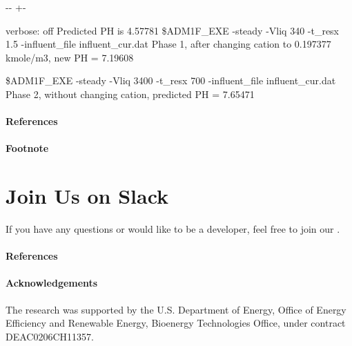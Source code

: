 \documentclass[a4paper,10pt,english]{sphinxmanual}
\newlength\nbsphinxcodecellspacing
\begin{document}
{

\kern-\sphinxverbatimsmallskipamount\kern-\baselineskip
\kern+\FrameHeightAdjust\kern-\fboxrule
\vspace{\nbsphinxcodecellspacing}

\begin{sphinxVerbatim}[commandchars=\\\{\}]
verbose: off
Predicted PH is 4.57781
\$ADM1F\_EXE -steady -Vliq 340 -t\_resx 1.5 -influent\_file influent\_cur.dat
Phase 1, after changing cation to 0.197377 kmole/m3, new PH = 7.19608

\$ADM1F\_EXE -steady -Vliq 3400 -t\_resx 700 -influent\_file influent\_cur.dat
Phase 2, without changing cation, predicted PH = 7.65471
\end{sphinxVerbatim}
}
\subsubsection*{References}
\subsubsection*{Footnote}


\chapter{Join Us on Slack}
\label{\detokenize{join:join-us-on-slack}}\label{\detokenize{join::doc}}
\sphinxAtStartPar
If you have any questions or would like to be a developer, feel free to join our .
\subsubsection*{References}
\subsubsection*{Acknowledgements}

\sphinxAtStartPar
The research was supported by the U.S. Department of Energy, Office of Energy Efficiency and Renewable Energy, Bioenergy Technologies Office, under contract DE\sphinxhyphen{}AC02\sphinxhyphen{}06CH11357.



\renewcommand{\indexname}{Index}
\printindex
\end{document}
